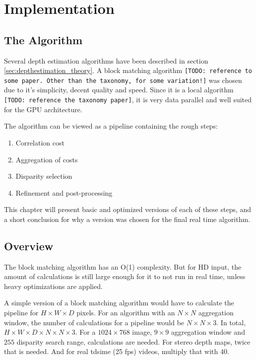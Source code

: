 \chapter{Implementation}

\section{The Algorithm}

Several depth estimation algorithms have been described in section
\ref{sec:depthestimation_theory}. A block matching algorithm
\texttt{[TODO: reference to some paper. Other than the taxonomy, for
  some variation!]} was chosen due to it's simplicity, decent quality
and speed. Since it is a local algorithm \texttt{[TODO: reference the
  taxonomy paper]}, it is very data parallel and well suited for the
GPU architecture.

The algorithm can be viewed as a pipeline containing the rough steps:

\begin{enumerate}
\item Correlation cost
\item Aggregation of costs
\item Disparity selection
\item Refinement and post-processing
\end{enumerate}

This chapter will present basic and optimized versions of each of
these steps, and a short conclusion for why a version was chosen for
the final real time algorithm.

\section{Overview}

The block matching algorithm has an O(1) complexity. But for HD input,
the amount of calculations is still large enough for it to not run in
real time, unless heavy optimizations are applied.

A simple version of a block matching algorithm would have to calculate
the pipeline for $H \times W \times D$ pixels. For an algorithm with
an $N \times N$ aggregation window, the number of calculations for a
pipeline would be $N \times N \times 3$. In total, $H \times W \times
D \times N \times N \times 3$. For a $1024 \times 768$ image, $9
\times 9$ aggregation window and $255$ disparity search range,
calculations are needed. For stereo depth maps, twice that is needed.
And for real tdsime (25 fps) videos, multiply that with 40.


